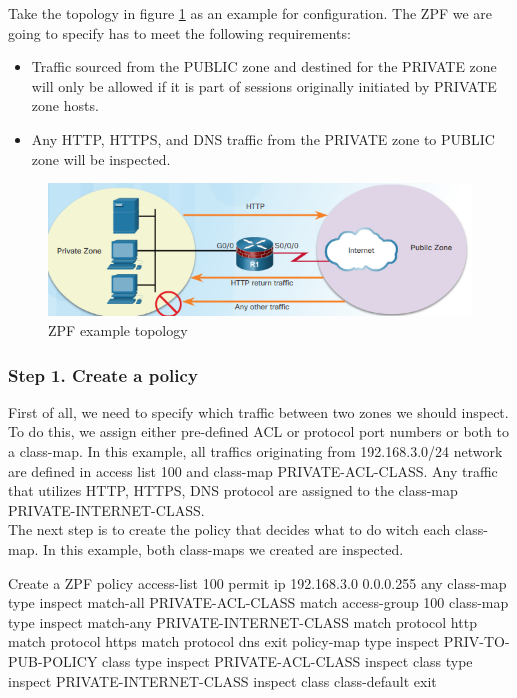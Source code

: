 Take the topology in figure \ref{ZPFtopology} as an example for configuration. The ZPF we are going to specify has to meet the following requirements:

\begin{itemize}
\item Traffic sourced from the PUBLIC zone and destined for the PRIVATE zone will only be allowed if it is part of sessions originally initiated by PRIVATE zone hosts.
\item Any HTTP, HTTPS, and DNS traffic from the PRIVATE zone to PUBLIC zone will be inspected. 
\end{itemize}


\begin{figure}[hbtp]
\caption{ZPF example topology}\label{ZPFtopology}
\centering
\includegraphics[scale=0.6]{pictures/ZPFtopology.PNG}
\end{figure}


\subsubsection{Step 1. Create a policy}
First of all, we need to specify which traffic between two zones we should inspect. To do this, we assign either pre-defined ACL or protocol port numbers or both to a class-map. In this example, all traffics originating from 192.168.3.0/24 network are defined in access list 100 and class-map PRIVATE-ACL-CLASS. Any traffic that utilizes HTTP, HTTPS, DNS protocol are assigned to the class-map PRIVATE-INTERNET-CLASS.\\

The next step is to create the policy that decides what to do witch each class-map. In this example, both class-maps we created are inspected.

\begin{sexylisting}{Create a ZPF policy}
access-list 100 permit ip 192.168.3.0 0.0.0.255 any
class-map type inspect match-all PRIVATE-ACL-CLASS
  match access-group 100    
class-map type inspect match-any PRIVATE-INTERNET-CLASS
  match protocol http
  match protocol https
  match protocol dns
exit    
policy-map type inspect PRIV-TO-PUB-POLICY
  class type inspect PRIVATE-ACL-CLASS   
  inspect    
  class type inspect PRIVATE-INTERNET-CLASS
  inspect
  class class-default
exit
\end{sexylisting}

